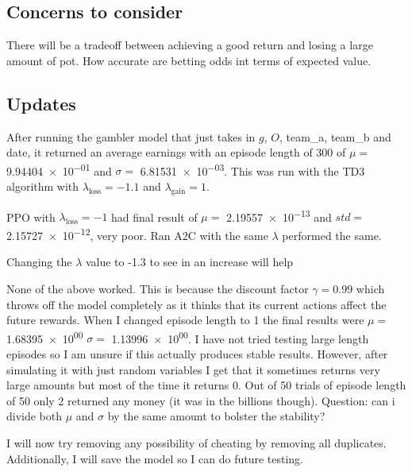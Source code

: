 \documentclass{article}
\begin{document}
    \subsection*{Concerns to consider}
        There will be a tradeoff between achieving a good return and losing a large amount of pot.
        How accurate are betting odds int terms of expected value.


    \subsection*{Updates}
        After running the gambler model that just takes in $g$, $O$, team\_a, team\_b and date, it returned an average earnings with an episode length of 300 of $\mu =$ \num{9.94404e-01} and $\sigma =$ \num{6.81531e-03}.
        This was run with the TD3 algorithm with $\lambda_{\text{loss}} = -1.1$ and $\lambda_{\text{gain}} = 1$.

        PPO with $\lambda_{\text{loss}} = -1$ had final result of $\mu=$ \num{2.19557e-13} and
        $std=$ \num{2.15727e-12}, very poor.
        Ran A2C with the same $\lambda$ performed the same.

        Changing the $\lambda$ value to -1.3 to see in an increase will help

        None of the above worked. This is because the discount factor $\gamma = 0.99$ which throws off the model
        completely as it thinks that its current actions affect the future rewards. When I changed episode length
        to 1 the final results were $\mu=$ \num{1.68395e+00} $\sigma=$ \num{1.13996e+00}. I have not tried
        testing large length episodes so I am unsure if this actually produces stable results. However,
        after simulating it with just random variables I get that it sometimes returns very large amounts but most
        of the time it returns 0. Out of 50 trials of episode length of 50 only 2 returned any money (it was in the 
        billions though). Question: can i divide both $\mu$ and $\sigma$ by the same amount to bolster the stability?

        I will now try removing any possibility of cheating by removing all duplicates. Additionally, I will save 
        the model so I can do future testing.
\end{document}
